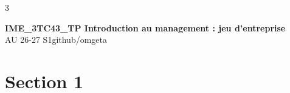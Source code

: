 \documentclass[12pt, a4paper]{article}
\newcommand{\mytitle}{IME\_3TC43\_TP Introduction au management : jeu d'entreprise}
\newcommand{\myauthor}{github/omgeta}
\newcommand{\mydate}{AU 26-27 S1}
\begin{document}
\raggedright
\footnotesize
\begin{multicols*}{3}
\setlength{\premulticols}{1pt}
\setlength{\postmulticols}{1pt}
\setlength{\multicolsep}{1pt}
\setlength{\columnsep}{2pt}

{\normalsize{\textbf{\mytitle}}}\\
{\footnotesize{\mydate\hspace{2pt}\textemdash\hspace{2pt}\myauthor}}
\section{Section 1}
\end{multicols*}
\end{document}
